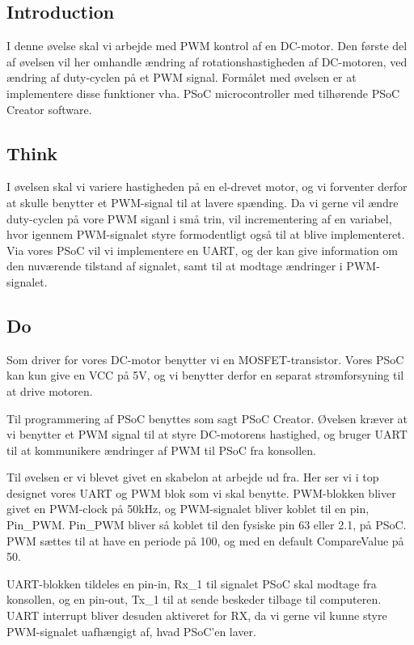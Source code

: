 \documentclass[../main.tex]{subfiles}
\begin{document}
\subsection{Introduction}
I denne øvelse skal vi arbejde med PWM kontrol af en DC-motor. Den første del af øvelsen vil her omhandle ændring af rotationshastigheden af DC-motoren, ved ændring af duty-cyclen på et PWM signal. 
Formålet med øvelsen er at implementere disse funktioner vha. PSoC microcontroller med tilhørende PSoC Creator software. 

\subsection{Think}
I øvelsen skal vi variere hastigheden på en el-drevet motor, og vi forventer derfor at skulle benytter et PWM-signal til at lavere spænding. Da vi gerne vil ændre duty-cyclen på vore PWM siganl i små trin, vil incrementering af en variabel, hvor igennem PWM-signalet styre formodentligt også til at blive implementeret. Via vores PSoC vil vi implementere en UART, og der kan give information om den nuværende tilstand af signalet, samt til at modtage ændringer i PWM-signalet.

\subsection{Do}
Som driver for vores DC-motor benytter vi en MOSFET-transistor. Vores PSoC kan kun give en VCC på 5V, og vi benytter derfor en separat strømforsyning til at drive motoren.


Til programmering af PSoC benyttes som sagt PSoC Creator. Øvelsen kræver at vi benytter et PWM signal til at styre DC-motorens hastighed, og bruger UART til at kommunikere ændringer af PWM til PSoC fra konsollen.

Til øvelsen er vi blevet givet en skabelon at arbejde ud fra. Her ser vi i top designet vores UART og PWM blok som vi skal benytte. PWM-blokken bliver givet en PWM-clock på 50kHz, og PWM-signalet bliver koblet til en pin, Pin\_PWM. Pin\_PWM bliver så koblet til den fysiske pin 63 eller 2.1, på PSoC. PWM sættes til at have en periode på 100, og med en default CompareValue på 50.


UART-blokken tildeles en pin-in, Rx\_1 til signalet PSoC skal modtage fra konsollen, og en pin-out, Tx\_1 til at sende beskeder tilbage til computeren. UART interrupt bliver desuden aktiveret for RX, da vi gerne vil kunne styre PWM-signalet uafhængigt af, hvad PSoC'en laver.
\end{document}
